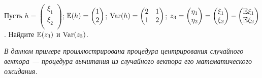 







\begin{problem}
Пусть $h =  \begin{pmatrix}
\xi_1 \\
\xi_2 \\
\end{pmatrix} $; $\mathbb{E} (h) =  \begin{pmatrix}
1\\
2\\
\end{pmatrix} $; $\operatorname{Var} (h) =  \begin{pmatrix}
2 & 1 \\
1 & 2 \\
\end{pmatrix} $; $z_3 =  \begin{pmatrix}
\eta_1 \\
\eta_2 \\
\end{pmatrix}  =  \begin{pmatrix}
\xi_1 \\
\xi_2 \\
\end{pmatrix}  -  \begin{pmatrix}
\mathbb{E} \xi_1 \\
\mathbb{E} \xi_2 \\
\end{pmatrix} $. Найдите $\mathbb{E} (z_3)$ и $\operatorname{Var} (z_3)$.


\begin{sol}
\textit{В данном примере проиллюстрирована процедура центрирования случайного вектора — процедура вычитания из случайного вектора его математического ожидания.}


\end{sol}
\end{problem}
